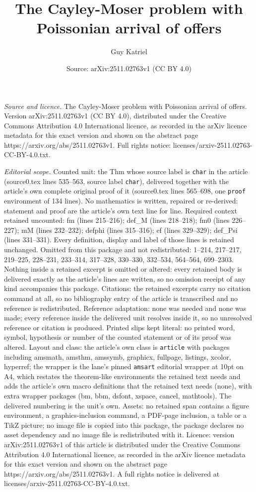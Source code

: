 \documentclass[10pt,a4paper]{amsart}
\title[The Cayley-Moser problem with Poissonian arrival of offers]{The Cayley-Moser problem with Poissonian arrival of offers}
\author{Guy Katriel}
\date{Source: arXiv:2511.02763v1 (CC BY 4.0)}
\begin{document}
\maketitle

\noindent\emph{Source and licence.} The Cayley-Moser problem with Poissonian arrival of offers. Version arXiv:2511.02763v1 (CC BY 4.0), distributed under the Creative Commons Attribution 4.0 International licence, as recorded in the arXiv licence metadata for this exact version and shown on the abstract page https://arxiv.org/abs/2511.02763v1. Full rights notice: licenses/arxiv-2511.02763-CC-BY-4.0.txt.\par\smallskip

\noindent\textit{Editorial scope.} Counted unit: the Thm whose source label is \texttt{char} in the article (source0.tex lines 535--563, source label \texttt{char}), delivered together with the article's own complete original proof of it (source0.tex lines 565--698, one \texttt{proof} environment of 134 lines). No mathematics is written, repaired or re-derived: statement and proof are the article's own text line for line. Required context retained uncounted: fm (lines 215--216); def\_M (lines 218--218); fm0 (lines 226--227); mM (lines 232--232); defphi (lines 315--316); ef (lines 329--329); def\_Psi (lines 331--331). Every definition, display and label of those lines is retained unchanged. Omitted from this package and not redistributed: 1--214, 217--217, 219--225, 228--231, 233--314, 317--328, 330--330, 332--534, 564--564, 699--2303. Nothing inside a retained excerpt is omitted or altered: every retained body is delivered exactly as the article's lines are written, so no omission receipt of any kind accompanies this package. Citations: the retained excerpts carry no citation command at all, so no bibliography entry of the article is transcribed and no reference is redistributed. Reference adaptation: none was needed and none was made; every reference inside the delivered unit resolves inside it, so no unresolved reference or citation is produced. Printed slips kept literal: no printed word, symbol, hypothesis or number of the counted statement or of its proof was altered. Layout and class: the article's own class is \texttt{article} with packages including amsmath, amsthm, amssymb, graphicx, fullpage, listings, xcolor, hyperref; the wrapper is the lane's pinned \texttt{amsart} editorial wrapper at 10pt on A4, which restates the theorem-like environments the retained text needs and adds the article's own macro definitions that the retained text needs (none), with extra wrapper packages (bm, bbm, dsfont, xspace, cancel, mathtools). The delivered numbering is the unit's own. Assets: no retained span contains a figure environment, a graphics-inclusion command, a PDF-page inclusion, a table or a TikZ picture; no image file is copied into this package, the package declares no asset dependency and no image file is redistributed with it. Licence: version arXiv:2511.02763v1 of this article is distributed under the Creative Commons Attribution 4.0 International licence, as recorded in the arXiv licence metadata for this exact version and shown on the abstract page https://arxiv.org/abs/2511.02763v1. A full rights notice is delivered at licenses/arxiv-2511.02763-CC-BY-4.0.txt. 
\end{document}
